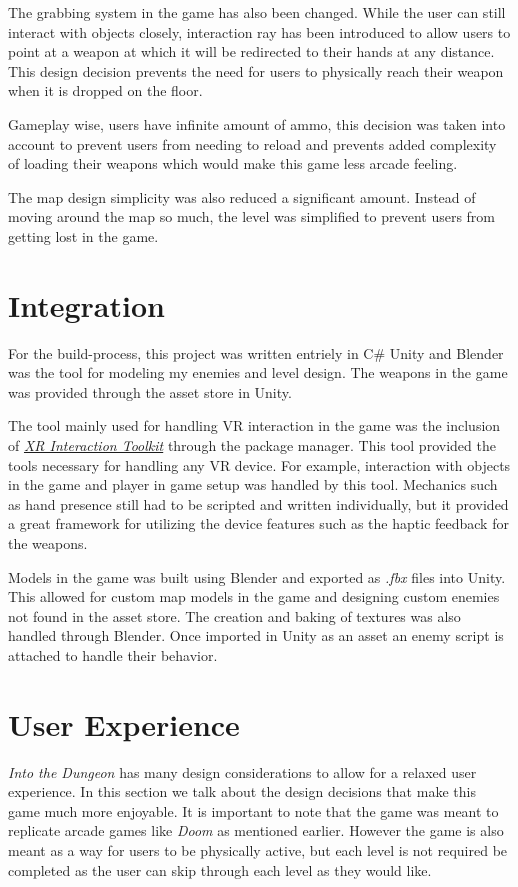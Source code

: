 \documentclass[12pt, twoside]{article}
\begin{document}
The grabbing system in the game has also been changed. While the user can still
interact with objects closely, interaction ray has been introduced to allow
users to point at a weapon at which it will be redirected to their hands at any
distance. This design decision prevents the need for users to physically reach
their weapon when it is dropped on the floor.\par

Gameplay wise, users have infinite amount of ammo, this decision was taken into
account to prevent users from needing to reload and prevents added complexity of
loading their weapons which would make this game less arcade feeling.\par

The map design simplicity was also reduced a significant amount. Instead of
moving around the map so much, the level was simplified to prevent users from
getting lost in the game.

\section{Integration}
For the build-process, this project was written entriely in C\# Unity and
Blender was the tool for modeling my enemies and level design. The weapons in
the game was provided through the asset store in Unity.\par 

The tool mainly used for handling VR interaction in the game was the inclusion
of
\emph{\href{https://docs.unity3d.com/Packages/com.unity.xr.interaction.toolkit@0.9/manual/index.html}{XR
Interaction Toolkit}} through the package manager. This tool provided the tools
necessary for handling any VR device. For example, interaction with objects in
the game and player in game setup was handled by this tool. Mechanics such as
hand presence still had to be scripted and written individually, but it provided
a great framework for utilizing the device features such as the haptic feedback
for the weapons. \par

Models in the game was built using Blender and exported as \emph{.fbx} files
into Unity. This allowed for custom map models in the game and designing custom
enemies not found in the asset store. The creation and baking of textures was
also handled through Blender. Once imported in Unity as an asset an enemy script
is attached to handle their behavior.

\section{User Experience}
\emph{Into the Dungeon} has many design considerations to allow for a relaxed
user experience. In this section we talk about the design decisions that make
this game much more enjoyable. It is important to note that the game was meant
to replicate arcade games like \emph{Doom} as mentioned earlier. However the
game is also meant as a way for users to be physically active, but each level is
not required be completed as the user can skip through each level as they would
like.
\end{document}
